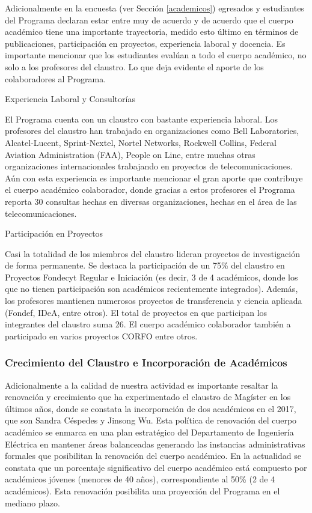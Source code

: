 Adicionalmente en la encuesta (ver Sección \ref{academicos}) egresados y estudiantes del
Programa declaran 
estar entre muy de acuerdo y de acuerdo que el cuerpo académico
tiene una importante trayectoria, medido esto último en términos de publicaciones, participación
en proyectos, experiencia laboral y docencia. Es importante mencionar que los estudiantes evalúan a todo 
el cuerpo académico, no solo a los profesores del claustro. Lo que deja evidente el aporte de los colaboradores
al Programa.

\noindent Experiencia Laboral y Consultorías

El Programa cuenta con un claustro con bastante experiencia laboral. Los profesores del claustro
han trabajado en organizaciones como Bell Laboratories, Alcatel-Lucent, Sprint-Nextel, Nortel Networks,
Rockwell Collins, Federal Aviation Administration (FAA), People on Line, entre muchas otras organizaciones
internacionales trabajando en proyectos de telecomunicaciones. Aún con esta experiencia es importante mencionar 
el gran aporte que contribuye el cuerpo académico colaborador, donde gracias a estos profesores el Programa
reporta 30 consultas hechas en diversas organizaciones, hechas en el área de las telecomunicaciones.

\noindent Participación en Proyectos

Casi la totalidad de los miembros del claustro
lideran proyectos de investigación de forma permanente. Se destaca la participación de un 75\% del
claustro en Proyectos Fondecyt Regular e Iniciación (es decir, 3 de 4 académicos, donde los que
no tienen participación son académicos recientemente integrados). Además, los profesores mantienen numerosos
proyectos de transferencia y ciencia aplicada (Fondef, IDeA, entre otros). El total de proyectos en que participan 
los integrantes del claustro suma 26. El cuerpo académico colaborador 
también a participado en varios proyectos CORFO entre otros. 

\subsubsection{Crecimiento del Claustro e Incorporación de Académicos}

Adicionalmente a
la calidad de nuestra actividad es importante resaltar la renovación y crecimiento que ha
experimentado el claustro de Magíster en los últimos años, donde se constata la incorporación
de dos académicos en el 2017, que son Sandra Céspedes y Jinsong Wu. 
Esta política de renovación del cuerpo académico se enmarca en una plan
estratégico del Departamento de Ingeniería Eléctrica en mantener áreas balanceadas generando
las instancias administrativas formales que posibilitan la renovación del cuerpo académico. En
la actualidad se constata que un porcentaje significativo del cuerpo académico está compuesto
por académicos jóvenes (menores de 40 años), correspondiente al 50\% (2 de 4 académicos). 
Esta renovación posibilita una proyección del Programa en el mediano plazo. 


